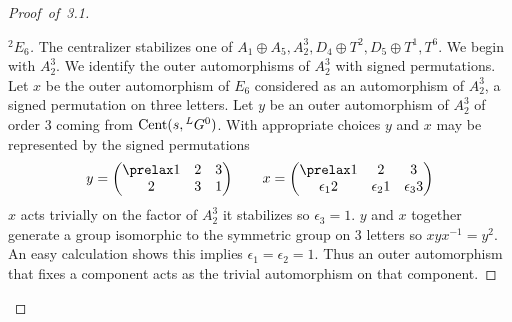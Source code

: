 \documentclass{memo-l}
\theoremstyle{definition}
\theoremstyle{remark}
\numberwithin{section}{chapter}
\numberwithin{equation}{chapter}
\begin{document}
\begin{proof}[Proof\ of\ 3.1]
\begin{proof}[${}^{2}E_{6}$]
   The centralizer stabilizes one of $A_{1}\oplus A_{5}, A_{2}^{3},
D_{4}\oplus T^{2}, D_{5}\oplus T^{1}, T^{6}$.  We begin with $A_{2}^{3}$.  We
identify the outer automorphisms of $A_{2}^{3}$ with signed permutations.
Let $x$ be the outer automorphism of $E_6$ considered as an automorphism of
$A_2^3$, a signed permutation on three letters.  Let $y$ be an outer automorphism
of $A_2^3$ of order 3 coming from $\hbox{Cent}(s,{}^LG^0)$.  With appropriate
choices $y$ and $x$ may be represented by the signed permutations
$$
y = \begin{pmatrix} \prelax  1&2&3\\ 2&3&1\end{pmatrix} \qquad x = \begin{pmatrix} \prelax  1&2&3\\
 \epsilon_1 2&\epsilon_2 1&\epsilon_3 3\end{pmatrix}
$$
$x$ acts trivially on the factor of $A_2^3$ it stabilizes so $\epsilon_3=1$.
$y$ and $x$ together generate a group isomorphic to the symmetric group on 3 letters
so $xyx^{-1} = y^2$.  An easy calculation shows this implies $\epsilon_1=\epsilon_2=1$.
Thus an outer automorphism that fixes a component acts as the trivial
automorphism on that component.





\end{proof}
\end{proof}
\end{document}

